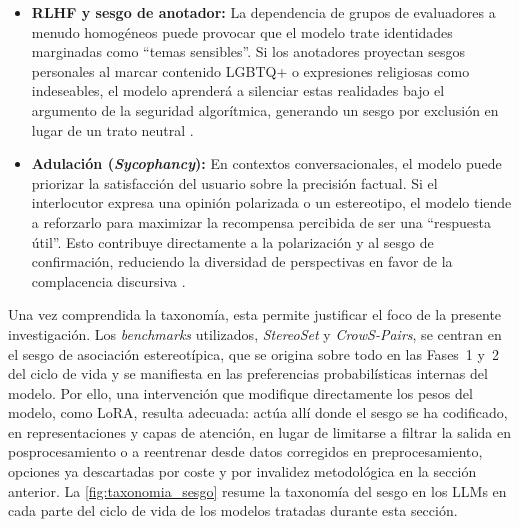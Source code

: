 \documentclass[12pt,a4paper]{report}
\begin{document}
\begin{itemize}
    \item \textbf{RLHF y sesgo de anotador:} La dependencia de grupos de evaluadores a menudo homogéneos puede provocar que el modelo trate identidades marginadas como ``temas sensibles''. Si los anotadores proyectan sesgos personales al marcar contenido LGBTQ+ o expresiones religiosas como indeseables, el modelo aprenderá a silenciar estas realidades bajo el argumento de la seguridad algorítmica, generando un sesgo por exclusión en lugar de un trato neutral \cite{wang_aligning_2023, devinney_we_2024}.
    
    \item \textbf{Adulación (\textit{Sycophancy}):} En contextos conversacionales, el modelo puede priorizar la satisfacción del usuario sobre la precisión factual. Si el interlocutor expresa una opinión polarizada o un estereotipo, el modelo tiende a reforzarlo para maximizar la recompensa percibida de ser una ``respuesta útil''. Esto contribuye directamente a la polarización y al sesgo de confirmación, reduciendo la diversidad de perspectivas en favor de la complacencia discursiva \cite{wang_aligning_2023}.
\end{itemize}

Una vez comprendida la taxonomía, esta permite justificar el foco de la presente investigación. Los \textit{benchmarks} utilizados, \textit{StereoSet} y \textit{CrowS-Pairs},
\cite{nadeem_stereoset_2021, nangia_crows-pairs_2020} se centran en el sesgo de asociación estereotípica, que se origina sobre todo en las Fases~1 y~2 del ciclo de vida
y se manifiesta en las preferencias probabilísticas internas del modelo. Por ello, una intervención que modifique directamente los pesos del modelo, como LoRA, 
resulta adecuada: actúa allí donde el sesgo se ha codificado, en representaciones y capas de atención, en lugar de limitarse a filtrar la salida en posprocesamiento o a reentrenar
desde datos corregidos en preprocesamiento, opciones ya descartadas por coste y por invalidez metodológica en la sección anterior.
La \autoref{fig:taxonomia_sesgo} resume la taxonomía del sesgo en los LLMs en cada parte del ciclo de vida de los modelos tratadas durante esta sección.
\end{document}
